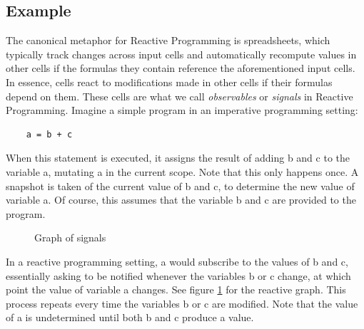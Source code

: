 \subsection{Example}

The canonical metaphor for Reactive Programming is spreadsheets, which typically track changes across input cells and automatically recompute values in other cells if the formulas they contain reference the aforementioned input cells. In essence, cells react to modifications made in other cells if their formulas depend on them. These cells are what we call \textit{observables} or \textit{signals} in Reactive Programming.
Imagine a simple program in an imperative programming setting:

\begin{lstlisting}
	a = b + c
\end{lstlisting}

When this statement is executed, it assigns the result of adding b and c to the variable a, mutating a in the current scope. Note that this only happens once. A snapshot is taken of the current value of b and c, to determine the new value of variable a. Of course, this assumes that the variable b and c are provided to the program.

\begin{figure}[h]
	\caption{Graph of signals}
	\label{fig:background-reactive-example}
\end{figure}

In a reactive programming setting, a would subscribe to the values of b and c, essentially asking to be notified whenever the variables b or c change, at which point the value of variable a changes. See figure \ref{fig:background-reactive-example} for the reactive graph. This process repeats every time the variables b or c are modified. Note that the value of a is undetermined until both b and c produce a value. 

